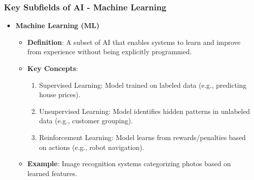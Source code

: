 \documentclass[aspectratio=169]{beamer}
\begin{document}
\begin{frame}[fragile]
    \frametitle{Key Subfields of AI - Machine Learning}
    \begin{itemize}
        \item \textbf{Machine Learning (ML)}
        \begin{itemize}
            \item \textbf{Definition}: A subset of AI that enables systems to learn and improve from experience without being explicitly programmed.
            \item \textbf{Key Concepts}:
                \begin{enumerate}
                    \item Supervised Learning: Model trained on labeled data (e.g., predicting house prices).
                    \item Unsupervised Learning: Model identifies hidden patterns in unlabeled data (e.g., customer grouping).
                    \item Reinforcement Learning: Model learns from rewards/penalties based on actions (e.g., robot navigation).
                \end{enumerate}
            \item \textbf{Example}: Image recognition systems categorizing photos based on learned features.
        \end{itemize}
    \end{itemize}
\end{frame}
\end{document}
